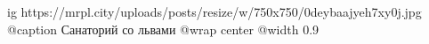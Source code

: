  
 
 
 
 

\ifcmt
  ig https://mrpl.city/uploads/posts/resize/w/750x750/0deybaajyeh7xy0j.jpg
	@caption Санаторий со львами
  @wrap center
  @width 0.9
\fi
